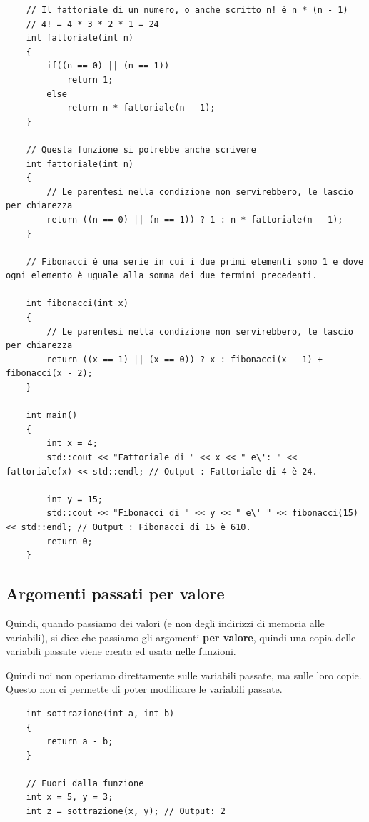 \begin{lstlisting}
	// Il fattoriale di un numero, o anche scritto n! è n * (n - 1)
	// 4! = 4 * 3 * 2 * 1 = 24
	int fattoriale(int n)
	{
		if((n == 0) || (n == 1))
			return 1;
		else
			return n * fattoriale(n - 1);
	}

	// Questa funzione si potrebbe anche scrivere
	int fattoriale(int n)
	{
		// Le parentesi nella condizione non servirebbero, le lascio per chiarezza
		return ((n == 0) || (n == 1)) ? 1 : n * fattoriale(n - 1);
	}

	// Fibonacci è una serie in cui i due primi elementi sono 1 e dove ogni elemento è uguale alla somma dei due termini precedenti. 
	
	int fibonacci(int x)
	{
		// Le parentesi nella condizione non servirebbero, le lascio per chiarezza
		return ((x == 1) || (x == 0)) ? x : fibonacci(x - 1) + fibonacci(x - 2);
	}

	int main()
	{
		int x = 4;
		std::cout << "Fattoriale di " << x << " e\': " << fattoriale(x) << std::endl; // Output : Fattoriale di 4 è 24.
		
		int y = 15;
		std::cout << "Fibonacci di " << y << " e\' " << fibonacci(15) << std::endl; // Output : Fibonacci di 15 è 610.
		return 0;
	}
\end{lstlisting}



\subsection{Argomenti passati per valore}

\textsf{\small Quindi, quando passiamo dei valori (e non degli indirizzi di memoria alle variabili), si dice che passiamo gli argomenti \textbf{per valore}, quindi una copia delle variabili passate viene creata ed usata nelle funzioni. }

\textsf{\small Quindi noi non operiamo direttamente sulle variabili passate, ma sulle loro copie. Questo non ci permette di poter modificare le variabili passate.} \\

\begin{lstlisting}
	int sottrazione(int a, int b)
	{
		return a - b;
	}

	// Fuori dalla funzione
	int x = 5, y = 3;
	int z = sottrazione(x, y); // Output: 2
\end{lstlisting}

